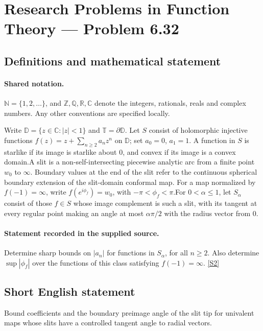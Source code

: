 \documentclass[11pt]{article}
\newcommand{\sref}[2]{\hyperlink{source:#1:#2}{[S#2]}}
\begin{document}
\section{Research Problems in Function Theory — Problem 6.32}\label{statement}

\subsection{Definitions and mathematical statement}

\paragraph{Shared notation.}$\mathbb N=\{1,2,\ldots\}$, and $\mathbb Z,\mathbb Q,\mathbb R,\mathbb C$ denote the integers, rationals, reals and complex numbers. Any other conventions are specified locally.


Write $\mathbb D=\{z\in\mathbb C:|z|<1\}$ and $\mathbb T=\partial\mathbb D$. Let $S$ consist of holomorphic injective functions $f(z)=z+\sum_{n\ge2}a_nz^n$ on $\mathbb D$; set $a_0=0$, $a_1=1$. A function in $S$ is starlike if its image is starlike about $0$, and convex if its image is a convex domain.A slit is a non-self-intersecting piecewise analytic arc from a finite point $w_0$ to $\infty$. Boundary values at the end of the slit refer to the continuous spherical boundary extension of the slit-domain conformal map. For a map normalized by $f(-1)=\infty$, write $f(e^{i\phi_f})=w_0$, with $-\pi<\phi_f<\pi$.For $0<\alpha\le1$, let $S_\alpha$ consist of those $f\in S$ whose image complement is such a slit, with its tangent at every regular point making an angle at most $\alpha\pi/2$ with the radius vector from $0$.
\paragraph{Statement recorded in the supplied source.}
Determine sharp bounds on $|a_n|$ for functions in $S_\alpha$, for all $n\ge2$. Also determine $\sup|\phi_f|$ over the functions of this class satisfying $f(-1)=\infty$. \sref{statement}{2}
\subsection{Short English statement}
Bound coefficients and the boundary preimage angle of the slit tip for univalent maps whose slits have a controlled tangent angle to radial vectors.
\end{document}

